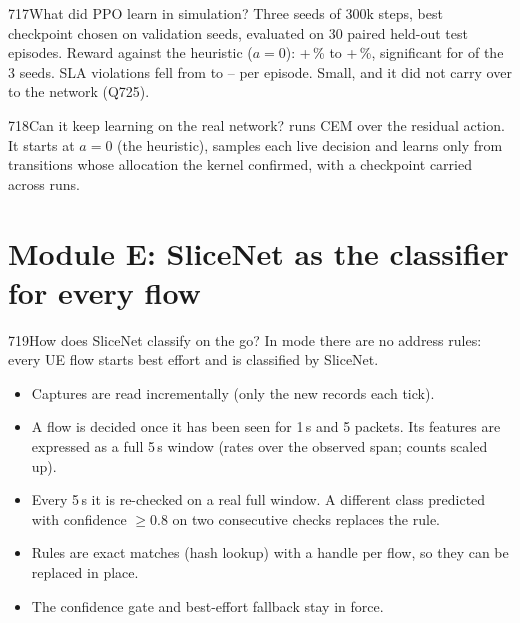 \begin{qa}{717}{What did PPO learn in simulation?}
Three seeds of 300k steps, best checkpoint chosen on validation seeds, evaluated on 30 paired held-out test episodes.
Reward against the heuristic ($a{=}0$): +\NResRelMin\,\% to +\NResRelMax\,\%, significant for \NResSigSeeds{} of the 3
seeds. SLA violations fell from
\NResViolHeuristic{} to \NResViolMin--\NResViolMax{} per episode. Small, and it did not carry over to the network (Q725).
\end{qa}

\begin{qa}{718}{Can it keep learning on the real network?}
 runs CEM over the residual action. It starts at $a{=}0$ (the heuristic), samples each live
decision and learns only from transitions whose allocation the kernel confirmed, with a checkpoint carried across runs.
\end{qa}

\section{Module E: SliceNet as the classifier for every flow}

\begin{qa}{719}{How does SliceNet classify on the go?}
In  mode there are no address rules: every UE flow starts best effort and is classified by SliceNet.
\begin{itemize}
\item Captures are read incrementally (only the new records each tick).
\item A flow is decided once it has been seen for 1\,s and 5 packets. Its features are expressed as a full 5\,s window
(rates over the observed span; counts scaled up).
\item Every 5\,s it is re-checked on a real full window. A different class predicted with confidence $\ge0.8$ on two
consecutive checks replaces the rule.
\item Rules are  exact matches (hash lookup) with a handle per flow, so they can be replaced in place.
\item The confidence gate and best-effort fallback stay in force.
\end{itemize}
\end{qa}

